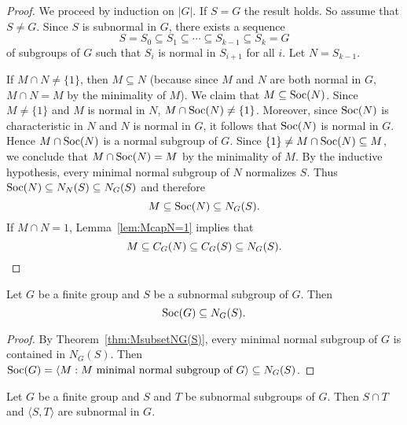 \begin{proof}
	We proceed by induction on $|G|$. If $S=G$ the result holds. So assume that 
	$S\ne G$.  Since $S$ is subnormal in $G$, there exists a sequence 
	\[
		S=S_0\subseteq S_1\subseteq\cdots\subseteq S_{k-1}\subseteq S_k=G
	\]
    of subgroups of $G$ such that $S_i$ is normal in $S_{i+1}$ for all $i$. 
	Let $N=S_{k-1}$. 

	If $M\cap N\ne\{1\}$, then $M\subseteq N$ (because since $M$ and $N$ are both normal in $G$, 
	$M\cap N=M$ by the minimality of $M$). We claim that 
	$M\subseteq\operatorname{Soc}(N)$.  Since $M\ne\{1\}$ and $M$ is normal in $N$,
	$M\cap\operatorname{Soc}(N)\ne\{1\}$. Moreover, since $\operatorname{Soc}(N)$ is characteristic in $N$ and $N$ is 
	normal in $G$, it follows that $\operatorname{Soc}(N)$ is normal in $G$. Hence $M\cap\operatorname{Soc}(N)$ is a normal subgroup of $G$. 
	Since $\{1\}\ne M\cap\operatorname{Soc}(N)\subseteq M$, we conclude that 
	$M\cap\operatorname{Soc}(N)=M$ by the minimality of $M$. By the inductive hypothesis, 
	every minimal normal subgroup of $N$ normalizes $S$. Thus 
	$\operatorname{Soc}(N)\subseteq N_N(S)\subseteq N_G(S)$ and therefore 
	\[
	M\subseteq\operatorname{Soc}(N)\subseteq N_G(S).
	\]
	If $M\cap N=1$, Lemma~\ref{lem:McapN=1} implies that 
	\[
	M\subseteq C_G(N)\subseteq C_G(S)\subseteq N_G(S). \qedhere
	\]
\end{proof}

\begin{corollary}
    Let $G$ be a finite group and $S$ be a subnormal subgroup of $G$. Then 
    \[
    \operatorname{Soc}(G)\subseteq N_G(S).
    \]
\end{corollary}

\begin{proof}
	By Theorem~\ref{thm:MsubsetNG(S)}, every minimal normal subgroup of $G$ is contained in $N_G(S)$. Then 
	$\operatorname{Soc}(G)=\langle M:M\text{ minimal normal subgroup of $G$}\rangle\subseteq N_G(S)$.
\end{proof}

\begin{theorem}[Wielandt]
	\label{thm:STsubnormal}
	Let $G$ be a finite group and $S$ and $T$ be subnormal subgroups of $G$. Then $S\cap T$ and 
	$\langle S,T\rangle$ are subnormal in $G$.
\end{theorem}

